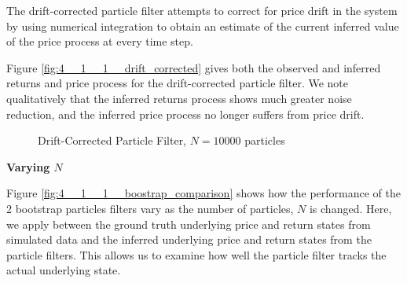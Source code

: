 \documentclass[../main.tex]{subfiles}
\begin{document}
The drift-corrected particle filter attempts to correct for price drift in the system by using numerical integration to obtain an estimate of the current inferred value of the price process at every time step. 

Figure \ref{fig:4__1__1__drift_corrected} gives both the observed and inferred returns and price process for the drift-corrected particle filter. We note qualitatively that the inferred returns process shows much greater noise reduction, and the inferred price process no longer suffers from price drift. 

\begin{figure}[h!]
	\centering
	\qquad
	\caption{Drift-Corrected Particle Filter, $N = 10000$ particles}
	\label{fig:4__1__1__drift_corrected_PF}
\end{figure}

\textbf{Varying $N$}

Figure \ref{fig:4__1__1__boostrap_comparison} shows how the performance of the 2 bootstrap particles filters vary as the number of particles, $N$ is changed. Here, we apply  between the ground truth underlying price and return states from simulated data and the inferred underlying price and return states from the particle filters. This allows us to examine how well the particle filter tracks the actual underlying state.
\end{document}
